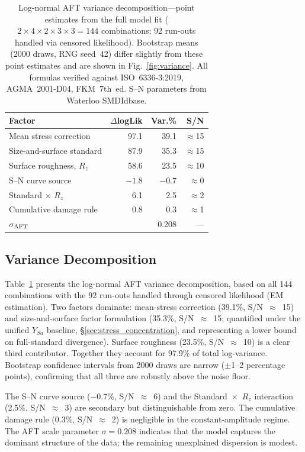 \documentclass[12pt,a4paper]{article}
\begin{document}
\begin{table}[h]
\centering
\caption{Log-normal AFT variance decomposition---point estimates from the
full model fit ($2\times4\times2\times3\times3 = 144$ combinations;
92 run-outs handled via censored likelihood). Bootstrap means
(2000 draws, RNG seed~42) differ slightly from these point estimates
and are shown in Fig.~\ref{fig:variance}.%
All formulas verified against ISO~6336-3:2019, AGMA~2001-D04, FKM~7th~ed.
S--N parameters from Waterloo SMDIdbase.}
\label{tab:anova}
\begin{tabular}{lrrr}
\toprule
Factor & $\Delta$logLik & Var.\% & S/N \\
\midrule
Mean stress correction      &  97.1 & 39.1 & $\approx$15 \\
Size-and-surface standard   &  87.9 & 35.3 & $\approx$15 \\
Surface roughness, $R_z$    &  58.6 & 23.5 & $\approx$10 \\
S--N curve source           & $-1.8$ & $-0.7$ & $\approx$0 \\
Standard $\times$ $R_z$     &   6.1 &  2.5 &  $\approx$2 \\
Cumulative damage rule      &   0.8 &  0.3 &  $\approx$1 \\
\midrule
$\sigma_{\rm AFT}$          &        & 0.208 & --- \\
\bottomrule
\end{tabular}
\end{table}

\subsection{Variance Decomposition}

Table~\ref{tab:anova} presents the log-normal AFT variance
decomposition, based on all 144 combinations with the 92 run-outs
handled through censored likelihood (EM estimation). Two factors
dominate: mean-stress correction (39.1\%, S/N~$\approx$~15) and
size-and-surface factor formulation (35.3\%, S/N~$\approx$~15;
quantified under the unified $Y_{Sa}$ baseline, \S\ref{sec:stress_concentration},
and representing a lower bound on full-standard divergence). Surface
roughness (23.5\%, S/N~$\approx$~10) is a clear third contributor.
Together they account for 97.9\% of total
log-variance. Bootstrap confidence intervals from 2000 draws are narrow
($\pm$1--2 percentage points), confirming that all three are robustly
above the noise floor.

The S--N curve source ($-$0.7\%, S/N~$\approx$~6) and the
Standard~$\times$~$R_z$ interaction (2.5\%, S/N~$\approx$~3) are secondary but
distinguishable from zero. The cumulative damage rule (0.3\%,
S/N~$\approx$~2) is negligible in the constant-amplitude regime. The
AFT scale parameter $\sigma = 0.208$ indicates that the model
captures the dominant structure of the data; the remaining
unexplained dispersion is modest.
\end{document}
